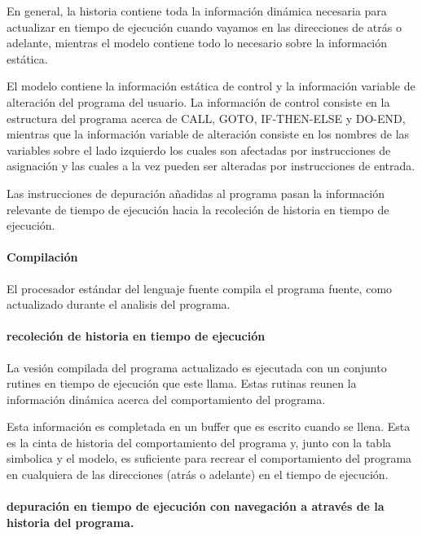 \documentclass[12pt,legalpaper]{report}
\begin{document}
En general, la historia contiene toda la información dinámica necesaria para actualizar en tiempo de ejecución cuando vayamos en las direcciones de atrás o adelante, mientras el modelo contiene todo lo necesario sobre la información estática.

El modelo contiene la información estática de control y la información variable de alteración del programa del usuario.  La información de control consiste en la estructura del programa acerca de CALL, GOTO, IF-THEN-ELSE y DO-END, mientras que la información variable de alteración consiste en los nombres de las variables sobre el lado izquierdo los cuales son afectadas por instrucciones de asignación y las cuales a la vez pueden ser alteradas por instrucciones de entrada.

Las instrucciones de depuración añadidas al programa pasan la información relevante de tiempo de ejecución hacia  la recoleción de historia en tiempo de ejecución.

				\paragraph{Compilación}

El procesador estándar del lenguaje fuente compila el programa fuente, como actualizado durante el analisis del programa.

				\paragraph[Recolección de historia]{recoleción de historia en tiempo de ejecución}

La vesión compilada del programa actualizado es ejecutada con un conjunto rutines en tiempo de ejecución que este llama.  Estas rutinas reunen la información dinámica acerca del comportamiento del programa.

Esta información es completada en un buffer que es escrito cuando se llena.  Esta es la cinta de historia del comportamiento del programa y, junto con la tabla simbolica y el modelo, es suficiente para recrear el comportamiento del programa en cualquiera de las direcciones (atrás o adelante) en el tiempo de ejecución.

				\paragraph[Historia del programa]{depuración en tiempo de ejecución con navegación a através de la historia del programa.}
\end{document}
